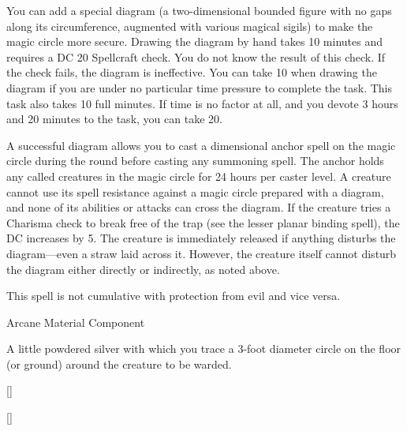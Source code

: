 {	You can add a special diagram (a two-dimensional bounded figure with no gaps along its circumference, augmented with various magical sigils) to make the magic circle more secure. Drawing the diagram by hand takes 10 minutes and requires a DC 20 Spellcraft check. You do not know the result of this check. If the check fails, the diagram is ineffective. You can take 10 when drawing the diagram if you are under no particular time pressure to complete the task. This task also takes 10 full minutes. If time is no factor at all, and you devote 3 hours and 20 minutes to the task, you can take 20.


	A successful diagram allows you to cast a dimensional anchor spell on the magic circle during the round before casting any summoning spell. The anchor holds any called creatures in the magic circle for 24 hours per caster level. A creature cannot use its spell resistance against a magic circle prepared with a diagram, and none of its abilities or attacks can cross the diagram. If the creature tries a Charisma check to break free of the trap (see the lesser planar binding spell), the DC increases by 5. The creature is immediately released if anything disturbs the diagram—even a straw laid across it. However, the creature itself cannot disturb the diagram either directly or indirectly, as noted above.


	This spell is not cumulative with protection from evil and vice versa.

Arcane Material Component

	A little powdered silver with which you trace a 3-foot diameter circle on the floor (or ground) around the creature to be warded.
}
        
[]
        
[]
        
